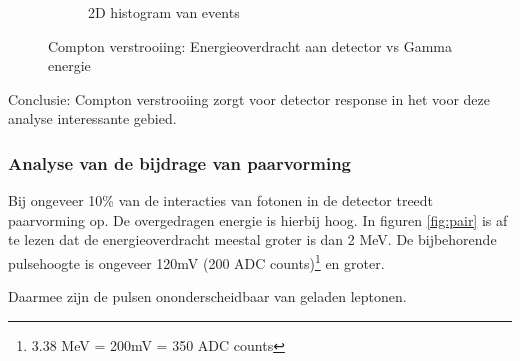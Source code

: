 \documentclass[a4paper,11pt]{article}
\begin{document}
\begin{figure}[h]
\begin{subfigure}[b]{0.6\textwidth}
                \caption{2D histogram van events}
                \label{fig:compton-hist3d}
        \end{subfigure}
        \caption{Compton verstrooiing: Energieoverdracht aan detector vs Gamma energie}\label{fig:compton}
\end{figure}


Conclusie: Compton verstrooiing zorgt voor detector response in het voor deze analyse interessante gebied.


\subsubsection{Analyse van de bijdrage van paarvorming}
Bij ongeveer 10\% van de interacties van fotonen in de detector treedt paarvorming op. De overgedragen energie is hierbij hoog. In figuren \ref{fig:pair} is af te lezen dat de energieoverdracht meestal groter is dan 2 MeV. De bijbehorende pulsehoogte is ongeveer 120mV (200 ADC counts)\footnote{3.38 MeV = 200mV = 350 ADC counts} en groter.

Daarmee zijn de pulsen ononderscheidbaar van geladen leptonen.
\end{document}
